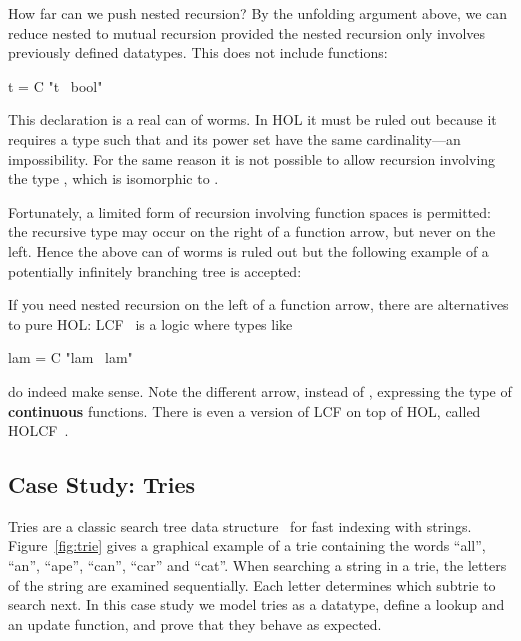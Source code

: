 How far can we push nested recursion? By the unfolding argument above, we can
reduce nested to mutual recursion provided the nested recursion only involves
previously defined datatypes. This does not include functions:
\begin{isabelle}
 t = C "t \isasymRightarrow\ bool"
\end{isabelle}
This declaration is a real can of worms.
In HOL it must be ruled out because it requires a type
 such that  and its power set  have the
same cardinality---an impossibility. For the same reason it is not possible
to allow recursion involving the type , which is isomorphic to
.

Fortunately, a limited form of recursion
involving function spaces is permitted: the recursive type may occur on the
right of a function arrow, but never on the left. Hence the above can of worms
is ruled out but the following example of a potentially infinitely branching tree is
accepted:
\smallskip


\bigskip

If you need nested recursion on the left of a function arrow, there are
alternatives to pure HOL: LCF~\cite{paulson87} is a logic where types like
\begin{isabelle}
 lam = C "lam \isasymrightarrow\ lam"
\end{isabelle}
do indeed make sense.  Note the different arrow,
\isa{\isasymrightarrow} instead of \isa{\isasymRightarrow},
expressing the type of \textbf{continuous} functions. 
There is even a version of LCF on top of HOL,
called HOLCF~\cite{MuellerNvOS99}.


\subsection{Case Study: Tries}
\label{sec:Trie}

Tries are a classic search tree data structure~\cite{Knuth3-75} for fast
indexing with strings. Figure~\ref{fig:trie} gives a graphical example of a
trie containing the words ``all'', ``an'', ``ape'', ``can'', ``car'' and
``cat''.  When searching a string in a trie, the letters of the string are
examined sequentially. Each letter determines which subtrie to search next.
In this case study we model tries as a datatype, define a lookup and an
update function, and prove that they behave as expected.

